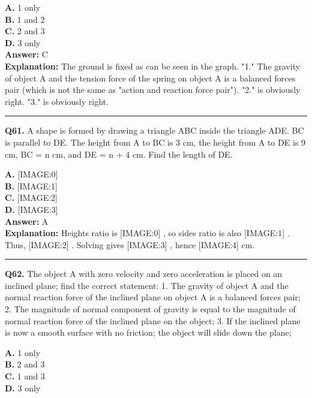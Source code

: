 \documentclass[12pt]{article}
\begin{document}
\textbf{A.} 1 only \\
\textbf{B.} 1 and 2 \\
\textbf{C.} 2 and 3 \\
\textbf{D.} 3 only \\

\textbf{Answer:} C \\
\textbf{Explanation:} The ground is fixed as can be seen in the graph. "1." The gravity of object A and the tension force of the spring on object A is a balanced forces pair (which is not the same as "action and reaction force pair"). "2." is obviously right. "3." is obviously right.

\hrule
\vspace{1em}


\noindent
\textbf{Q61.} A shape is formed by drawing a triangle ABC inside the triangle ADE. BC is parallel to DE. The height from A to BC is 3 cm, the height from A to DE is 9 cm, BC = n cm, and DE = n + 4 cm.
Find the length of DE.



\textbf{A.} [IMAGE:0] \\
\textbf{B.} [IMAGE:1] \\
\textbf{C.} [IMAGE:2] \\
\textbf{D.} [IMAGE:3] \\

\textbf{Answer:} A \\
\textbf{Explanation:} Heights ratio is
[IMAGE:0]
, so sides ratio is also
[IMAGE:1]
. Thus,
[IMAGE:2]
. Solving gives
[IMAGE:3]
, hence
[IMAGE:4]
cm.

\hrule
\vspace{1em}


\noindent
\textbf{Q62.} The object A with zero velocity and zero acceleration is placed on an inclined plane; find the correct statement:
1.
The gravity of object A and the normal reaction force of the inclined plane on object A is a balanced forces pair;
2.
The magnitude of normal component of gravity is equal to the magnitude of normal reaction force of the inclined plane on the object;
3.
If the inclined plane is now a smooth surface with no friction; the object will slide down the plane;



\textbf{A.} 1 only \\
\textbf{B.} 2 and 3 \\
\textbf{C.} 1 and 3 \\
\textbf{D.} 3 only \\
\end{document}
